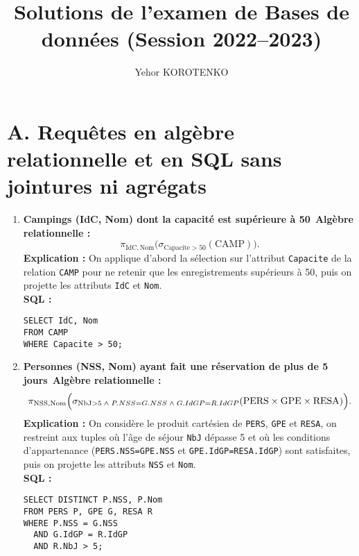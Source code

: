 \documentclass[a4paper,11pt]{article}
\begin{document}
\title{Solutions de l'examen de Bases de données (Session 2022--2023)}
\author{Yehor KOROTENKO}
\date{}
\maketitle

\section*{A. Requêtes en algèbre relationnelle et en SQL sans jointures ni agrégats}
\begin{enumerate}
  \item \textbf{Campings (IdC, Nom) dont la capacité est supérieure à 50}\
    \textbf{Algèbre relationnelle :}
    \[
      \pi_{\mathrm{IdC},\mathrm{Nom}}\bigl(\sigma_{\mathrm{Capacite}>50}(\mathrm{CAMP})\bigr).
    \]
    \textbf{Explication :} On applique d'abord la sélection sur l'attribut \texttt{Capacite} de la relation \texttt{CAMP} pour ne retenir que les enregistrements supérieurs à 50, puis on projette les attributs \texttt{IdC} et \texttt{Nom}.\\
    \textbf{SQL :}
    \begin{verbatim}
SELECT IdC, Nom
FROM CAMP
WHERE Capacite > 50;
    \end{verbatim}

  \item \textbf{Personnes (NSS, Nom) ayant fait une réservation de plus de 5 jours}\
    \textbf{Algèbre relationnelle :}
    \[
      \pi_{\mathrm{NSS},\mathrm{Nom}}\Bigl(\sigma_{\mathrm{NbJ}>5 \;\wedge\; P.NSS=G.NSS \;\wedge\; G.IdGP=R.IdGP}(\mathrm{PERS}\times\mathrm{GPE}\times\mathrm{RESA})\Bigr).
    \]
    \textbf{Explication :} On considère le produit cartésien de \texttt{PERS}, \texttt{GPE} et \texttt{RESA}, on restreint aux tuples où l'âge de séjour \texttt{NbJ} dépasse 5 et où les conditions d'appartenance (\texttt{PERS.NSS=GPE.NSS} et \texttt{GPE.IdGP=RESA.IdGP}) sont satisfaites, puis on projette les attributs \texttt{NSS} et \texttt{Nom}.\\
    \textbf{SQL :}
    \begin{verbatim}
SELECT DISTINCT P.NSS, P.Nom
FROM PERS P, GPE G, RESA R
WHERE P.NSS = G.NSS
  AND G.IdGP = R.IdGP
  AND R.NbJ > 5;
    \end{verbatim}


\end{enumerate}
\end{document}
